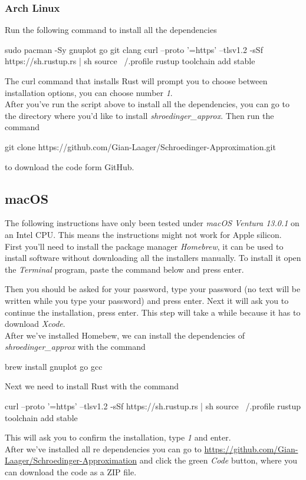 \documentclass[11pt,DIV=10,final]{scrreprt} %
\begin{document}
\subsubsection{Arch Linux}
Run the following command to install all the dependencies
\begin{bashcode}
sudo pacman -Sy gnuplot go git clang
curl --proto '=https' --tlsv1.2 -sSf https://sh.rustup.rs | sh
source ~/.profile
rustup toolchain add stable
\end{bashcode}
The curl command that installs Rust will prompt you to choose between installation options, you can choose number \emph{1}.
\\[3ex]
After you've run the script above to install all the dependencies, you can go to the directory where you'd like to install \emph{shroedinger\_approx}. Then run the command
\begin{bashcode}
git clone https://github.com/Gian-Laager/Schroedinger-Approximation.git
\end{bashcode}
to download the code form GitHub.

\subsection{macOS}
The following instructions have only been tested under \emph{macOS Ventura 13.0.1} on an Intel CPU. This means the instructions might not work for Apple silicon.
\\[3ex]
First you'll need to install the package manager \emph{Homebrew}, it can be used to install software without downloading all the installers manually. To install it open the \emph{Terminal} program, paste the command below and press enter.
Then you should be asked for your password, type your password (no text will be written while you type your password) and press enter.
Next it will ask you to continue the installation, press enter. This step will take a while because it has to download \emph{Xcode}.
\\[3ex]
After we've installed Homebew, we can install the dependencies of \emph{shroedinger\_approx} with the command
\begin{bashcode}
brew install gnuplot go gcc
\end{bashcode}
\vspace*{3ex}
Next we need to install Rust with the command
\begin{bashcode}
curl --proto '=https' --tlsv1.2 -sSf https://sh.rustup.rs | sh
source ~/.profile
rustup toolchain add stable
\end{bashcode}
This will ask you to confirm the installation, type \emph{1} and enter.
\\[3ex]
After we've installed all re dependencies you can go to \url{https://github.com/Gian-Laager/Schroedinger-Approximation} and click the green \emph{Code} button,
where you can download the code as a ZIP file.
\end{document}
